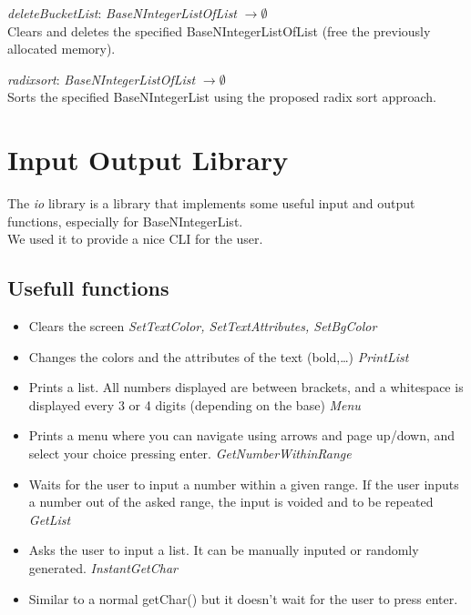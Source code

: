 \documentclass[book, backcover, english, nodocumentinfo]{upmethodology-document}
\begin{document}
		\begin{minipage}{\linewidth}
			\textit{deleteBucketList}: \textit{BaseNIntegerListOfList} $\rightarrow \emptyset$\\
			Clears and deletes the specified BaseNIntegerListOfList (free the previously allocated memory).
			\label{algo:BNIL-DeleteBucketList}
			
		\end{minipage}
		\nxtalgo{}

		\begin{minipage}{\linewidth}
			\textit{radixsort}: \textit{BaseNIntegerListOfList} $\rightarrow \emptyset$\\
			Sorts the specified BaseNIntegerList using the proposed radix sort approach.
			\label{algo:BNIL-RadixSort}
			
		\end{minipage}
		\nxtalgo{}

\chapter{Input Output Library} \label{chapter:IO-Lib}
	The \textit{io} library is a library that implements some useful input and output functions, especially for BaseNIntegerList.\\
	We used it to provide a nice CLI for the user.\\
	\section{Usefull functions}
	\begin{itemize}
		\textit{Clear}\\
		\item{} Clears the screen
		\textit{SetTextColor, SetTextAttributes, SetBgColor}\\
		\item{}    Changes the colors and the attributes of the text (bold,\ldots)
		\textit{PrintList}\\
		\item{}    Prints a list. All numbers displayed are between brackets, and a whitespace is displayed every 3 or 4 digits (depending on the base)
		\textit{Menu}\\
		\item{}    Prints a menu where you can navigate using arrows and page up/down, and select your choice pressing enter.
		\textit{GetNumberWithinRange}\\
		\item{}    Waits for the user to input a number within a given range. If the user inputs a number out of the asked range, the input is voided and to be repeated
		\textit{GetList}
		\item{}    Asks the user to input a list. It can be manually inputed or randomly generated.
		\textit{InstantGetChar}\\
		\item{}    Similar to a normal getChar() but it doesn't wait for the user to press enter.
	\end{itemize}
\end{document}
